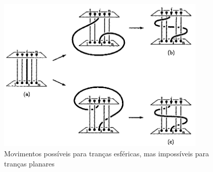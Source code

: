 \documentclass[a4paper,portuguese,11pt,twoside, leqno]{book}
\theoremstyle{definition}
\begin{document}
	\begin{figure}[H]
		\begin{center}
			\includegraphics[width=10cm]{Images/movimentos_trancas_esfericas.png}
		\end{center}\caption{Movimentos possíveis para tranças esféricas, mas impossíveis para tranças planares}
		\label{movimentos trancas esfericas}
	\end{figure} 
	
\end{document}
